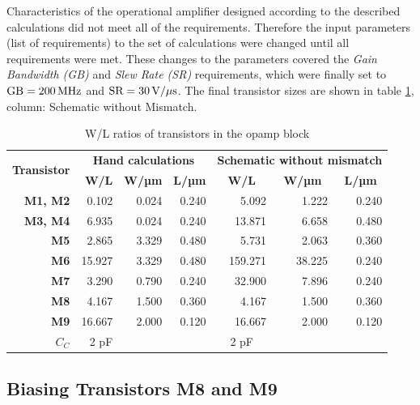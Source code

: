 \documentclass[parskip,oneside,colorbacktitle,10pt,accentcolor=tud1b,table]{tudreport}
\begin{document}
{Characteristics of the operational amplifier designed according to the described calculations did not meet all of the requirements. Therefore the input parameters (list of requirements) to the set of calculations were changed until all requirements were met. These changes to the parameters covered the \textit{Gain Bandwidth (GB)} and \textit{Slew Rate (SR)} requirements, which were finally set to $\text{GB} = \unit[200]{MHz}$ and $\text{SR} = \unit[30]{V/\mu s}$. The final transistor sizes are shown in table \ref{tab:opamp:wl}, column: \glqq Schematic without Mismatch\grqq.

\begin{table}[H]
  \centering
    \begin{tabular}{|r|r|r|r|r|r|r|}
    \hline
    \multicolumn{1}{|c|}{\multirow{2}[4]{*}{\textbf{Transistor}}} & \multicolumn{3}{c|}{\textbf{Hand calculations}} & \multicolumn{3}{c|}{\textbf{Schematic  without mismatch}}  \\
    \cline{2-7} \multicolumn{1}{|c|}{} & \textbf{W/L} & \textbf{W/µm} & \textbf{L/µm} & \multicolumn{1}{c|}{\textbf{W/L}} & \multicolumn{1}{c|}{\textbf{W/µm}} & \multicolumn{1}{c|}{\textbf{L/µm}} \\
    \hline
    \textbf{M1, M2} &  0.102  &  0.024  &  0.240  & 5.092 & 1.222 & 0.240 \\
    \hline
    \textbf{M3, M4} &  6.935  &  0.024  &  0.240  & 13.871 & 6.658 & 0.480 \\
    \hline
    \textbf{M5} &  2.865  &  3.329  &  0.480  & 5.731 & 2.063 & 0.360 \\
    \hline
    \textbf{M6} &  15.927  &  3.329  &  0.480  & 159.271 & 38.225 & 0.240 \\
    \hline
    \textbf{M7} &  3.290  &  0.790  &  0.240  & 32.900 & 7.896 & 0.240 \\
    \hline
    \textbf{M8} &  4.167 & 1.500  &  0.360  & 4.167 & 1.500 & 0.360 \\
    \hline
    \textbf{M9} &  16.667 & 2.000  &  0.120  & 16.667 & 2.000 & 0.120 \\
    \hline
    \textbf{$C_C$} & 2 pF &    &    & \multicolumn{1}{c|}{2 pF} & \multicolumn{1}{c|}{} & \multicolumn{1}{c|}{} \\
    \hline
    \end{tabular}
  \caption{W/L ratios of transistors in the opamp block}
  \label{tab:opamp:wl}
\end{table}

\subsection{Biasing Transistors M8 and M9}

}
\end{document}
